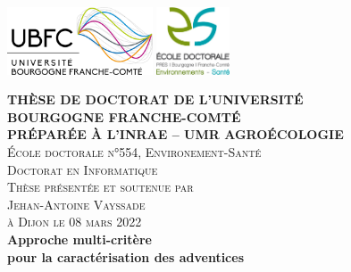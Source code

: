 \documentclass[12pt, a4paper, twoside]{scrbook}
\begin{document}
    \frontmatter

	\BgThispage
    \begin{titlepage}
            \includegraphics[height=2cm]{img/covers/ubfc-logo}
            \hfill
            \includegraphics[height=2cm]{img/covers/e2s-big}
            \vfill
            
            \begin{center}
	            \textbf{\bfseries THÈSE DE DOCTORAT DE L'UNIVERSITÉ \\ BOURGOGNE FRANCHE-COMTÉ \\ PRÉPARÉE À L'INRAE -- UMR AGROÉCOLOGIE} \\[1.5cm]
	        
	        	\textsc{École doctorale n°554, Environement-Santé} \\
	        	\textsc{Doctorat en Informatique} \\[.5cm]
	        	\textsc{Thèse présentée et soutenue par \\ \large Jehan-Antoine Vayssade \\ \small à Dijon le 08 mars 2022}\\[1.cm]
	        	
	        	{ \Large \bfseries Approche multi-critère \\ pour la caractérisation des adventices }
	        \end{center}
        	
            
            

\end{titlepage}
\end{document}
